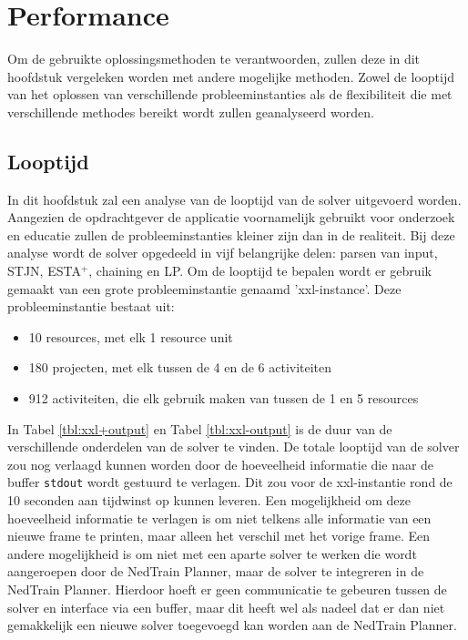\section{Performance}
Om de gebruikte oplossingsmethoden te verantwoorden, zullen deze in dit hoofdstuk vergeleken worden met andere mogelijke methoden. Zowel de looptijd van het oplossen van verschillende probleeminstanties als de flexibiliteit die met verschillende methodes bereikt wordt zullen geanalyseerd worden.

\subsection{Looptijd}
In dit hoofdstuk zal een analyse van de looptijd van de solver uitgevoerd worden. Aangezien de opdrachtgever de applicatie voornamelijk gebruikt voor onderzoek en educatie zullen de probleeminstanties kleiner zijn dan in de realiteit. Bij deze analyse wordt de solver opgedeeld in vijf belangrijke delen: parsen van input, STJN, ESTA$^+$, chaining en LP. Om de looptijd te bepalen wordt er gebruik gemaakt van een grote probleeminstantie genaamd 'xxl-instance'. Deze probleeminstantie bestaat uit:
\begin{itemize}
    \item 10 resources, met elk 1 resource unit
    \item 180 projecten, met elk tussen de 4 en de 6 activiteiten
    \item 912 activiteiten, die elk gebruik maken van tussen de 1 en 5 resources
\end{itemize}

In Tabel \ref{tbl:xxl+output} en Tabel \ref{tbl:xxl-output} is de duur van de verschillende onderdelen van de solver te vinden. De totale looptijd van de solver zou nog verlaagd kunnen worden door de hoeveelheid informatie die naar de buffer \texttt{stdout} wordt gestuurd te verlagen. Dit zou voor de xxl-instantie rond de 10 seconden aan tijdwinst op kunnen leveren. Een mogelijkheid om deze hoeveelheid informatie te verlagen is om niet telkens alle informatie van een nieuwe frame te printen, maar alleen het verschil met het vorige frame. Een andere mogelijkheid is om niet met een aparte solver te werken die wordt aangeroepen door de NedTrain Planner, maar de solver te integreren in de NedTrain Planner. Hierdoor hoeft er geen communicatie te gebeuren tussen de solver en interface via een buffer, maar dit heeft wel als nadeel dat er dan niet gemakkelijk een nieuwe solver toegevoegd kan worden aan de NedTrain Planner.

